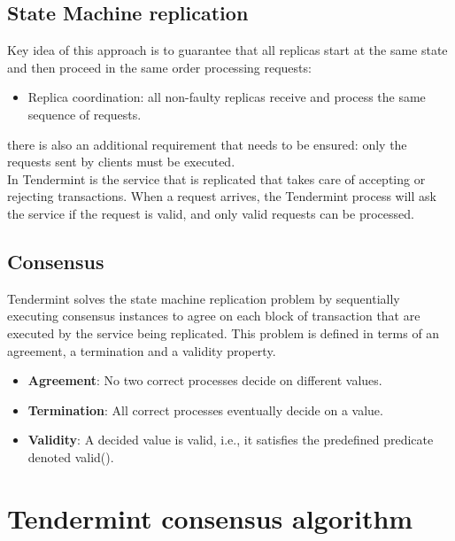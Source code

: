 \documentclass{article}
\begin{document}
   \subsection{State Machine replication}
   Key idea of this approach is to guarantee that all replicas start at the same state and then proceed in the same order processing requests:
   \begin{itemize}
   	\item Replica coordination: all non-faulty replicas receive and process the same sequence of requests.
   \end{itemize}
   there is also an additional requirement that needs to be ensured: only the requests sent by clients must be executed.\\
   In Tendermint is the service that is replicated that takes care of accepting or rejecting transactions. When a request arrives, the Tendermint process will ask the service if the request is valid, and only valid requests can be processed.
   \subsection{Consensus}
   Tendermint solves the state machine replication problem by sequentially executing consensus instances to agree on each block of transaction that are executed by the service being replicated. This problem is defined in terms of an agreement, a termination and a validity property.
   \begin{itemize}
   	\item \textbf{Agreement}: No two correct processes decide on different values.
	\item \textbf{Termination}: All correct processes eventually decide on a value.
	\item \textbf{Validity}: A decided value is valid, i.e., it satisfies the predefined predicate denoted valid().
   \end{itemize}
   \newpage
   \section{Tendermint consensus algorithm}
\end{document}
